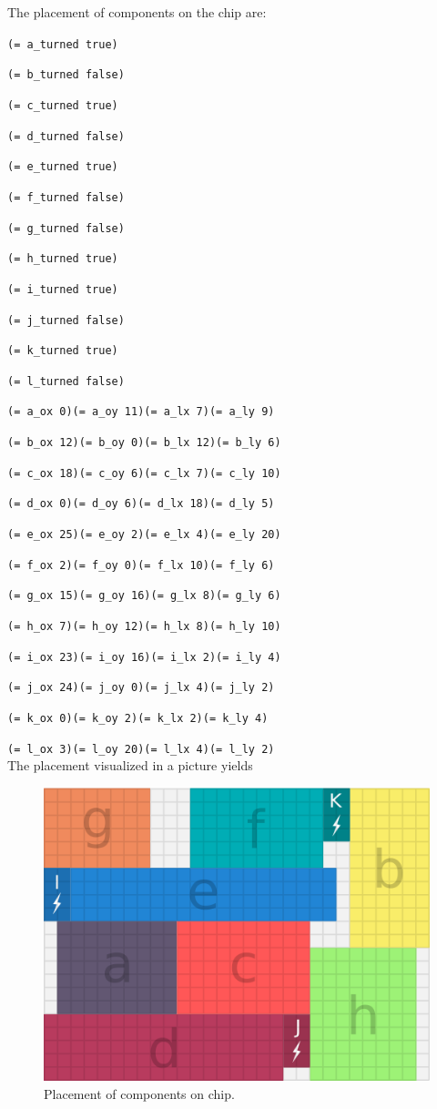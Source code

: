 \documentclass[a4paper]{article}
\begin{document}
	The placement of components on the chip are:
	
	{\tt (= a\_turned true)}
	
	{\tt (= b\_turned false)}
	
	{\tt (= c\_turned true)}
	
	{\tt (= d\_turned false)}
	
	{\tt (= e\_turned true)}
	
	{\tt (= f\_turned false)}
	
	{\tt (= g\_turned false)}
	
	{\tt (= h\_turned true)}
	
	{\tt (= i\_turned true)}
	
	{\tt (= j\_turned false)}
	
	{\tt (= k\_turned true)}
	
	{\tt (= l\_turned false)}
	
	{\tt (= a\_ox 0)(= a\_oy 11)(= a\_lx 7)(= a\_ly 9)}
	
	{\tt (= b\_ox 12)(= b\_oy 0)(= b\_lx 12)(= b\_ly 6)}
	
	{\tt (= c\_ox 18)(= c\_oy 6)(= c\_lx 7)(= c\_ly 10)}
	
	{\tt (= d\_ox 0)(= d\_oy 6)(= d\_lx 18)(= d\_ly 5)}
	
	{\tt (= e\_ox 25)(= e\_oy 2)(= e\_lx 4)(= e\_ly 20)}
	
	{\tt (= f\_ox 2)(= f\_oy 0)(= f\_lx 10)(= f\_ly 6)}
	
	{\tt (= g\_ox 15)(= g\_oy 16)(= g\_lx 8)(= g\_ly 6)}
	
	{\tt (= h\_ox 7)(= h\_oy 12)(= h\_lx 8)(= h\_ly 10)}
	
	{\tt (= i\_ox 23)(= i\_oy 16)(= i\_lx 2)(= i\_ly 4)}
	
	{\tt (= j\_ox 24)(= j\_oy 0)(= j\_lx 4)(= j\_ly 2)}
	
	{\tt (= k\_ox 0)(= k\_oy 2)(= k\_lx 2)(= k\_ly 4)}
	
	{\tt (= l\_ox 3)(= l\_oy 20)(= l\_lx 4)(= l\_ly 2)}\\
	
	The placement visualized in a picture yields
	\begin{figure}[H]
		\centering
		\includegraphics[scale=0.7]{power-grid-3.png}
		\caption{Placement of components on chip.}
	\end{figure}
	
\end{document}

